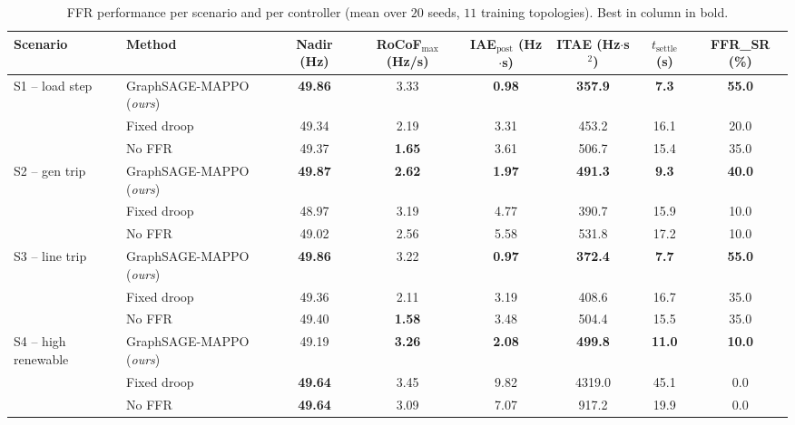 \begin{table}[!t]
\caption{FFR performance per scenario and per controller (mean over
$20$ seeds, $11$ training topologies). Best in column in bold.}
\label{tab:ffr_main}
\centering
\footnotesize
\begin{tabular}{llcccccc}
\toprule
Scenario & Method & Nadir (Hz) & RoCoF$_{\max}$ (Hz/s) &
IAE$_{\mathrm{post}}$ (Hz$\cdot$s) & ITAE (Hz$\cdot$s$^{2}$) &
$t_{\mathrm{settle}}$ (s) & FFR\_SR (\%) \\
\midrule
\multirow{3}{*}{S1 -- load step}
  & GraphSAGE-MAPPO (\emph{ours}) & \textbf{49.86} & 3.33          & \textbf{0.98} & \textbf{357.9}  & \textbf{7.3}  & \textbf{55.0} \\
  & Fixed droop                   & 49.34          & 2.19          & 3.31          & 453.2           & 16.1          & 20.0 \\
  & No FFR                        & 49.37          & \textbf{1.65} & 3.61          & 506.7           & 15.4          & 35.0 \\
\midrule
\multirow{3}{*}{S2 -- gen trip}
  & GraphSAGE-MAPPO (\emph{ours}) & \textbf{49.87} & \textbf{2.62} & \textbf{1.97} & \textbf{491.3}  & \textbf{9.3}  & \textbf{40.0} \\
  & Fixed droop                   & 48.97          & 3.19          & 4.77          & 390.7           & 15.9          & 10.0 \\
  & No FFR                        & 49.02          & 2.56          & 5.58          & 531.8           & 17.2          & 10.0 \\
\midrule
\multirow{3}{*}{S3 -- line trip}
  & GraphSAGE-MAPPO (\emph{ours}) & \textbf{49.86} & 3.22          & \textbf{0.97} & \textbf{372.4}  & \textbf{7.7}  & \textbf{55.0} \\
  & Fixed droop                   & 49.36          & 2.11          & 3.19          & 408.6           & 16.7          & 35.0 \\
  & No FFR                        & 49.40          & \textbf{1.58} & 3.48          & 504.4           & 15.5          & 35.0 \\
\midrule
\multirow{3}{*}{S4 -- high renewable}
  & GraphSAGE-MAPPO (\emph{ours}) & 49.19          & \textbf{3.26} & \textbf{2.08} & \textbf{499.8}  & \textbf{11.0} & \textbf{10.0} \\
  & Fixed droop                   & \textbf{49.64} & 3.45          & 9.82          & 4319.0          & 45.1          & 0.0           \\
  & No FFR                        & \textbf{49.64} & 3.09          & 7.07          & 917.2           & 19.9          & 0.0           \\
\bottomrule
\end{tabular}
\end{table}

